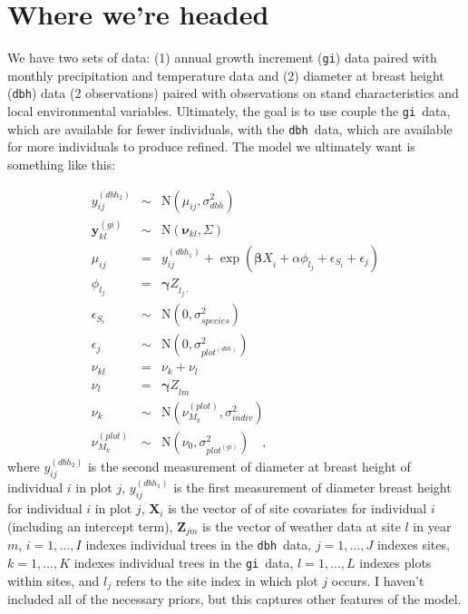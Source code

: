 \documentclass[12pt]{article}
\newcommand{\gi}{{\tt gi}}
\newcommand{\dbh}{{\tt dbh}}
\begin{document}
\section*{Where we're headed}

We have two sets of data: (1) annual growth increment (\gi) data paired
with monthly precipitation and temperature data and (2) diameter at
breast height (\dbh) data (2 observations) paired with observations on stand
characteristics and local environmental variables. Ultimately, the
goal is to use couple the \gi\ data, which are available for fewer
individuals, with the \dbh\ data, which are available for more
individuals to produce refined. The model we ultimately want is
something like this:

\begin{eqnarray*}
y^{(dbh_2)}_{ij} &\sim& \mbox{N}(\mu_{ij}, \sigma^2_{dbh}) \\
{\bm y}^{(gi)}_{kl} &\sim& \mbox{N}({\bm\nu}_{kl}, \Sigma) \\
\mu_{ij} &=& y^{(dbh_1)}_{ij} + \exp{({\bm\beta X}_i + \alpha\phi_{l_j} +
             \epsilon_{S_i} + \epsilon_{j})} \\
\phi_{l_j} &=& {\bm\gamma Z}_{l_j\cdot} \\
\epsilon_{S_i} &\sim& \mbox{N}(0, \sigma^2_{species}) \\
\epsilon_{j} &\sim& \mbox{N}(0, \sigma^2_{plot^{(dbh)}}) \\
\nu_{kl} &=& \nu_k + \nu_l \\
\nu_l &=& {\bm\gamma Z}_{lm} \\
\nu_k &\sim& \mbox{N}(\nu^{(plot)}_{M_k}, \sigma^2_{indiv}) \\
\nu^{(plot)}_{M_k} &\sim& \mbox{N}(\nu_0, \sigma^2_{plot^{(gi)}})
\quad ,
\end{eqnarray*}
where $y_{ij}^{(dbh_2)}$ is the second measurement of diameter at
breast height of individual $i$ in plot $j$, $y_{ij}^{(dbh_1)}$ is the
first measurement of diameter breast height for individual $i$ in plot
$j$, ${\bm X}_i$ is the vector of of site covariates for individual
$i$ (including an intercept term), ${\bm Z}_{jm}$ is the vector of
weather data at site $l$ in year $m$, $i=1,\dots,I$ indexes individual
trees in the \dbh\ data, $j=1,\dots,J$ indexes sites, $k=1,\dots,K$
indexes individual trees in the \gi\ data, $l=1,\dots,L$ indexes plots
within sites, and $l_j$ refers to the site index in which plot $j$
occurs. I haven't included all of the necessary priors, but this
captures other features of the model.
\end{document}
